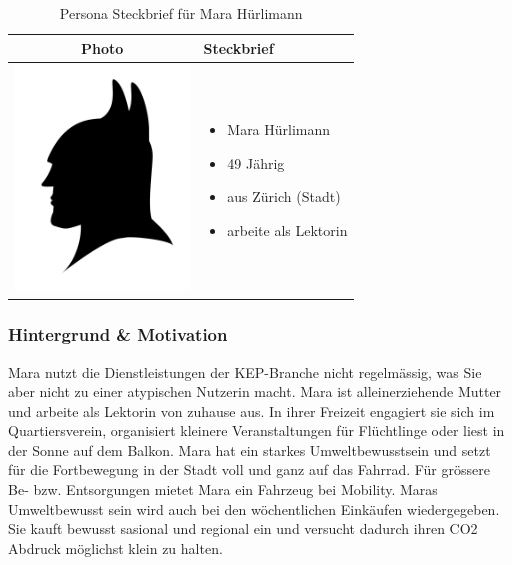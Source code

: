 \begin{table}[h!]
  \centering
  \begin{tabular}{ | c | m{5cm} | }
    \hline
    Photo & Steckbrief \\ \hline
    \begin{minipage}{.3\textwidth}
      \includegraphics[width=\linewidth, height=60mm]{images/batman.jpg}
    \end{minipage}
    &
      \begin{itemize}
        \item Mara Hürlimann
        \item 49 Jährig
        \item aus Zürich (Stadt)
        \item arbeite als Lektorin
      \end{itemize}
    \\ \hline
  \end{tabular}
  \caption{Persona Steckbrief für Mara Hürlimann}\label{tbl:steckbriefmara}
\end{table}

\subsubsection{Hintergrund \& Motivation}
Mara nutzt die Dienstleistungen der KEP-Branche nicht regelmässig, was Sie aber nicht zu einer atypischen Nutzerin macht. Mara ist alleinerziehende Mutter und arbeite als Lektorin von zuhause aus. In ihrer Freizeit engagiert sie sich im Quartiersverein, organisiert kleinere Veranstaltungen für Flüchtlinge oder liest in der Sonne auf dem Balkon. Mara hat ein starkes Umweltbewusstsein und setzt für die Fortbewegung in der Stadt voll und ganz auf das Fahrrad. Für grössere Be- bzw. Entsorgungen mietet Mara ein Fahrzeug bei Mobility. Maras Umweltbewusst sein wird auch bei den wöchentlichen Einkäufen wiedergegeben. Sie kauft bewusst sasional und regional ein und versucht dadurch ihren CO2 Abdruck möglichst klein zu halten.

